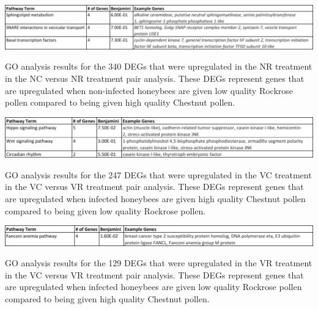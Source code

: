 \documentclass[11pt,a4paper,oldfontcommands,openany]{memoir}
\numberwithin{equation}{section} %
\begin{document}
\begin{table}[H]
  \includegraphics[width=\textwidth]{Images/NCNRNRPathways}
  \caption{GO analysis results for the 340 DEGs that were upregulated in the NR treatment in the NC versus NR treatment pair analysis. These DEGs represent genes that are upregulated when non-infected honeybees are given low quality Rockrose pollen compared to being given high quality Chestnut pollen.}
  \label{tbl:NCNRNRPathways}
\end{table}

\begin{table}[H]
  \includegraphics[width=\textwidth]{Images/VCVRVCPathways}
  \caption{GO analysis results for the 247 DEGs that were upregulated in the VC treatment in the VC versus VR treatment pair analysis. These DEGs represent genes that are upregulated when infected honeybees are given high quality Chestnut pollen compared to being given low quality Rockrose pollen.}
  \label{tbl:VCVRVCPathways}
\end{table}

\begin{table}[H]
  \includegraphics[width=\textwidth]{Images/VCVRVRPathways}
  \caption{GO analysis results for the 129 DEGs that were upregulated in the VR treatment in the VC versus VR treatment pair analysis. These DEGs represent genes that are upregulated when infected honeybees are given low quality Rockrose pollen compared to being given high quality Chestnut pollen.}
  \label{tbl:VCVRVRPathways}
\end{table}
\end{document}
